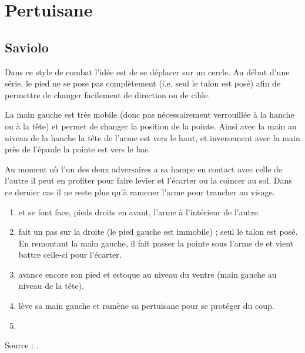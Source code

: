 \chapter{Pertuisane}

\section{Saviolo}

Dans ce style de combat l'idée est de se déplacer sur un cercle. Au début d'une série, le pied ne se pose pas complètement (i.e. seul le talon est posé) afin de permettre de changer facilement de direction ou de cible.

La main gauche est très mobile (donc pas nécessairement verrouillée à la hanche ou à la tête) et permet de changer la position de la pointe. Ainsi avec la main au niveau de la hanche la tête de l'arme est vers le haut, et inversement avec la main près de l'épaule la pointe est vers le bas.

Au moment où l'un des deux adversaires a sa hampe en contact avec celle de l'autre il peut en profiter pour faire levier et l'écarter ou la coincer au sol. Dans ce dernier cas il ne reste plus qu'à ramener l'arme pour trancher au visage.

\begin{exercice}
\begin{enumerate}
	\item \A et \D se font face, pieds droits en avant, l'arme à l'intérieur de l'autre.
	\item \A fait un pas sur la droite (le pied gauche est immobile) ; seul le talon est posé. En remontant la main gauche, il fait passer la pointe sous l'arme de \D et vient battre celle-ci pour l'écarter.
	\item \A avance encore son pied et estoque au niveau du ventre (main gauche au niveau de la tête).
	\item \D lève sa main gauche et ramène sa pertuisane pour se protéger du coup.
	\item {}
\end{enumerate}

Source : \cite[expliqué par Paul et Raphaël]{livermore:cornucopia:partizan:2014}.
\end{exercice}

